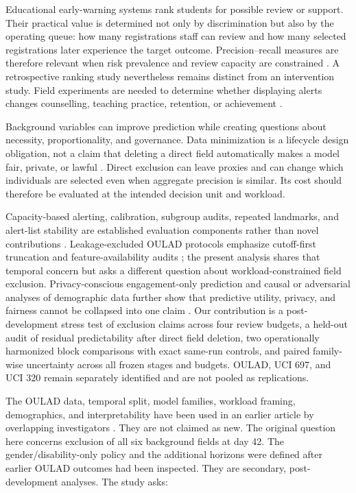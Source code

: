\documentclass[11pt]{article}
\begin{document}
Educational early-warning systems rank students for possible review or support. Their practical value is determined not only by discrimination but also by the operating queue: how many registrations staff can review and how many selected registrations later experience the target outcome. Precision--recall measures are therefore relevant when risk prevalence and review capacity are constrained \citep{saito2015precision}. A retrospective ranking study nevertheless remains distinct from an intervention study. Field experiments are needed to determine whether displaying alerts changes counselling, teaching practice, retention, or achievement \citep{plak2022early}.

Background variables can improve prediction while creating questions about necessity, proportionality, and governance. Data minimization is a lifecycle design obligation, not a claim that deleting a direct field automatically makes a model fair, private, or lawful \citep{gdpr2016,drachsler2016delicate,rets2023six}. Direct exclusion can leave proxies and can change which individuals are selected even when aggregate precision is similar. Its cost should therefore be evaluated at the intended decision unit and workload.

Capacity-based alerting, calibration, subgroup audits, repeated landmarks, and alert-list stability are established evaluation components rather than novel contributions \citep{wu2026calibrated,wuluo2026zenodo}. Leakage-excluded OULAD protocols emphasize cutoff-first truncation and feature-availability audits \citep{le2026leap}; the present analysis shares that temporal concern but asks a different question about workload-constrained field exclusion. Privacy-conscious engagement-only prediction and causal or adversarial analyses of demographic data further show that predictive utility, privacy, and fairness cannot be collapsed into one claim \citep{chiu2026privacy,hasan2022utility}. Our contribution is a post-development stress test of exclusion claims across four review budgets, a held-out audit of residual predictability after direct field deletion, two operationally harmonized block comparisons with exact same-run controls, and paired family-wise uncertainty across all frozen stages and budgets. OULAD, UCI 697, and UCI 320 remain separately identified and are not pooled as replications.

The OULAD data, temporal split, model families, workload framing, demographics, and interpretability have been used in an earlier article by overlapping investigators \citep{shaikhanova2025interpretable}. They are not claimed as new. The original question here concerns exclusion of all six background fields at day 42. The gender/disability-only policy and the additional horizons were defined after earlier OULAD outcomes had been inspected. They are secondary, post-development analyses. The study asks:
\end{document}
